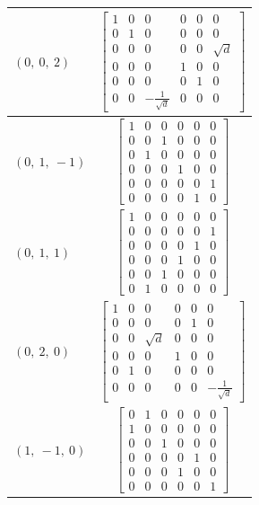 \documentclass[11pt]{article}
\theoremstyle{definition}
\begin{document}
\begin{longtable}{|l|c|}
    \hline
    $\left( 0, \  0, \  2\right)$ & ${\left[\begin{matrix}1 & 0 & 0 & 0 & 0 & 0\\0 & 1 & 0 & 0 & 0 & 0\\0 & 0 & 0 & 0 & 0 & \sqrt{d}\\0 & 0 & 0 & 1 & 0 & 0\\0 & 0 & 0 & 0 & 1 & 0\\0 & 0 & - \frac{1}{\sqrt{d}} & 0 & 0 & 0\end{matrix}\right]}$ \\
    \hline
    $\left( 0, \  1, \  -1\right)$ & ${\left[\begin{matrix}1 & 0 & 0 & 0 & 0 & 0\\0 & 0 & 1 & 0 & 0 & 0\\0 & 1 & 0 & 0 & 0 & 0\\0 & 0 & 0 & 1 & 0 & 0\\0 & 0 & 0 & 0 & 0 & 1\\0 & 0 & 0 & 0 & 1 & 0\end{matrix}\right]}$ \\
    \hline
    $\left( 0, \  1, \  1\right)$ & ${\left[\begin{matrix}1 & 0 & 0 & 0 & 0 & 0\\0 & 0 & 0 & 0 & 0 & 1\\0 & 0 & 0 & 0 & 1 & 0\\0 & 0 & 0 & 1 & 0 & 0\\0 & 0 & 1 & 0 & 0 & 0\\0 & 1 & 0 & 0 & 0 & 0\end{matrix}\right]}$ \\
    \hline
    $\left( 0, \  2, \  0\right)$ & ${\left[\begin{matrix}1 & 0 & 0 & 0 & 0 & 0\\0 & 0 & 0 & 0 & 1 & 0\\0 & 0 & \sqrt{d} & 0 & 0 & 0\\0 & 0 & 0 & 1 & 0 & 0\\0 & 1 & 0 & 0 & 0 & 0\\0 & 0 & 0 & 0 & 0 & - \frac{1}{\sqrt{d}}\end{matrix}\right]}$ \\
    \hline
    $\left( 1, \  -1, \  0\right)$ & ${\left[\begin{matrix}0 & 1 & 0 & 0 & 0 & 0\\1 & 0 & 0 & 0 & 0 & 0\\0 & 0 & 1 & 0 & 0 & 0\\0 & 0 & 0 & 0 & 1 & 0\\0 & 0 & 0 & 1 & 0 & 0\\0 & 0 & 0 & 0 & 0 & 1\end{matrix}\right]}$ \\

\end{longtable}
\end{document}
